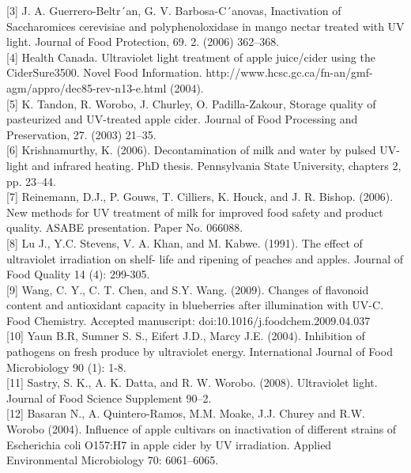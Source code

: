 \documentclass[journal]{IEEEtran}
\begin{document}
[3] J. A. Guerrero-Beltr´an, G. V. Barbosa-C´anovas, Inactivation of Saccharomices cerevisiae and polyphenoloxidase in mango nectar treated
with UV light. Journal of Food Protection, 69. 2. (2006) 362–368.\\[0.001in]

[4] Health Canada. Ultraviolet light treatment of apple juice/cider using the CiderSure3500. Novel Food Information. http://www.hcsc.gc.ca/fn-an/gmf-agm/appro/dec85-rev-n13-e.html (2004).\\[0.001in]

[5] K. Tandon, R. Worobo, J. Churley, O. Padilla-Zakour, Storage quality
of pasteurized and UV-treated apple cider. Journal of Food Processing
and Preservation, 27. (2003) 21–35.\\[0.001in]

[6] Krishnamurthy, K. (2006). Decontamination of milk and
water by pulsed UV-light and infrared heating. PhD thesis.
Pennsylvania State University, chapters 2, pp. 23–44.\\[0.001in]

[7] Reinemann, D.J., P. Gouws, T. Cilliers, K. Houck, and J. R.
Bishop. (2006). New methods for UV treatment of milk for
improved food safety and product quality. ASABE presentation. Paper No. 066088.\\[0.001in]

[8] Lu J., Y.C. Stevens, V. A. Khan, and M. Kabwe. (1991). The
effect of ultraviolet irradiation on shelf- life and ripening of
peaches and apples. Journal of Food Quality 14 (4): 299-305.\\[0.001in]

[9] Wang, C. Y., C. T. Chen, and S.Y. Wang. (2009). Changes of
flavonoid content and antioxidant capacity in blueberries after
illumination with UV-C. Food Chemistry. Accepted manuscript: doi:10.1016/j.foodchem.2009.04.037\\[0.001in]

[10] Yaun B.R, Sumner S. S., Eifert J.D., Marcy J.E. (2004).
Inhibition of pathogens on fresh produce by ultraviolet energy.
International Journal of Food Microbiology 90 (1): 1-8.\\[0.001in]

[11] Sastry, S. K., A. K. Datta, and R. W. Worobo. (2008). Ultraviolet light. Journal of Food Science Supplement 90–2.\\[0.001in]

[12] Basaran N., A. Quintero-Ramos, M.M. Moake, J.J. Churey
and R.W. Worobo (2004). Influence of apple cultivars on
inactivation of different strains of Escherichia coli O157:H7
in apple cider by UV irradiation. Applied Environmental
Microbiology 70: 6061–6065.\\[0.001in]
\end{document}
